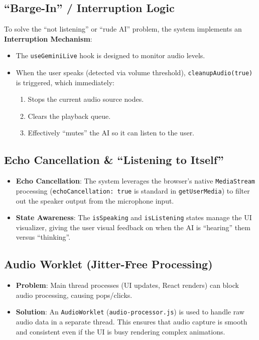 \documentclass{article}
\begin{document}
\subsection{``Barge-In'' / Interruption Logic}
To solve the ``not listening'' or ``rude AI'' problem, the system implements an \textbf{Interruption Mechanism}:
\begin{itemize}
    \item The \texttt{useGeminiLive} hook is designed to monitor audio levels.
    \item When the user speaks (detected via volume threshold), \texttt{cleanupAudio(true)} is triggered, which immediately:
    \begin{enumerate}
        \item Stops the current audio source nodes.
        \item Clears the playback queue.
        \item Effectively ``mutes'' the AI so it can listen to the user.
    \end{enumerate}
\end{itemize}

\subsection{Echo Cancellation \& ``Listening to Itself''}
\begin{itemize}
    \item \textbf{Echo Cancellation}: The system leverages the browser's native \texttt{MediaStream} processing (\texttt{echoCancellation: true} is standard in \texttt{getUserMedia}) to filter out the speaker output from the microphone input.
    \item \textbf{State Awareness}: The \texttt{isSpeaking} and \texttt{isListening} states manage the UI visualizer, giving the user visual feedback on when the AI is ``hearing'' them versus ``thinking''.
\end{itemize}

\subsection{Audio Worklet (Jitter-Free Processing)}
\begin{itemize}
    \item \textbf{Problem}: Main thread processes (UI updates, React renders) can block audio processing, causing pops/clicks.
    \item \textbf{Solution}: An \texttt{AudioWorklet} (\texttt{audio-processor.js}) is used to handle raw audio data in a separate thread. This ensures that audio capture is smooth and consistent even if the UI is busy rendering complex animations.
\end{itemize}
\end{document}
